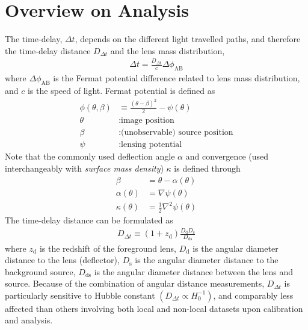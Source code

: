 \documentclass{cosmo}
\begin{document}
\section{Overview on Analysis}
    The time-delay, $\Delta t$, depends on the different light travelled paths, and therefore the time-delay distance $D_{\Delta t}$ and the lens mass distribution, 
    \begin{align*}
        \Delta t = \frac{D_{\Delta t}}{c} \Delta \phi_{\mathrm{AB}}
    \end{align*}
    where $\Delta \phi_{\mathrm{AB}}$ is the Fermat potential difference related to lens mass distribution, and $c$ is the speed of light. Fermat potential is defined as 
    \begin{align*}
        \phi (\theta, \beta) &\equiv \frac{\left(\theta - \beta\right)^2}{2}-\psi(\theta)\\
        \theta &: \text{image position}\\
        \beta &: \text{(unobservable) source position}\\
        \psi &: \text{lensing potential}
    \end{align*}
    Note that the commonly used deflection angle $\alpha$ and convergence (used interchangeably with \textit{surface mass density}) $\kappa$ is defined through
    \begin{align*}
        \beta &= \theta - \alpha(\theta)\\
        \alpha (\theta) &= \nabla \psi (\theta)\\
        \kappa (\theta) &= \frac{1}{2} \nabla^2 \psi(\theta)
    \end{align*}
    The time-delay distance can be formulated as 
    \begin{align*}
        D_{\Delta t} \equiv (1+z_{\mathrm{d}})\frac{D_\mathrm{d} D_\mathrm{s}}{D_\mathrm{ds}}
    \end{align*}
    where $z_\mathrm{d}$ is the redshift of the foreground lens, $D_\mathrm{d}$ is the angular diameter distance to the lens (deflector), $D_\mathrm{s}$ is the angular diameter distance to the background source, $D_\mathrm{ds}$ is the angular diameter distance between the lens and source. Because of the combination of angular distance measurements, $D_{\Delta t}$ is particularly sensitive to Hubble constant $(D_{\Delta t} \propto H_\mathrm{0}^{-1})$, and comparably less affected than others involving both local and non-local datasets upon calibration and analysis. 
    
\end{document}
